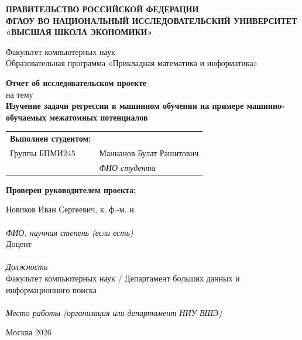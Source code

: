 \documentclass[12pt,a4paper]{article}
\begin{document}
\begin{titlepage}
\thispagestyle{empty}
\begin{center}
\textbf{ПРАВИТЕЛЬСТВО РОССИЙСКОЙ ФЕДЕРАЦИИ}\\
\textbf{ФГАОУ ВО НАЦИОНАЛЬНЫЙ ИССЛЕДОВАТЕЛЬСКИЙ УНИВЕРСИТЕТ}\\
\textbf{«ВЫСШАЯ ШКОЛА ЭКОНОМИКИ»}
\end{center}

\vspace{0.8cm}

\begin{center}
Факультет компьютерных наук\\
Образовательная программа «Прикладная математика и информатика»
\end{center}

\vfill

\begin{center}
\textbf{Отчет об исследовательском проекте}\\
на тему\\
\textbf{Изучение задачи регрессии в машинном обучении на примере машинно-обучаемых межатомных потенциалов}
\end{center}

\vfill

\noindent
\begin{tabularx}{\textwidth}{@{}lX@{}}
\textbf{Выполнен студентом:} & \\
Группы БПМИ245\,\underline{\hspace{2.0cm}} & Маннанов Булат Рашитович\\
 & \textit{ФИО студента}\\
\end{tabularx}

\vspace{0.8cm}

\noindent
\textbf{Проверен руководителем проекта:}\\
\begin{center}
Новиков Иван Сергеевич, к. ф.-м. н.\\[-0.2cm]
\makebox[\textwidth]{\hrulefill}\\
\textit{ФИО, научная степень (если есть)}\\[0.6cm]
Доцент\\[-0.2cm]
\makebox[\textwidth]{\hrulefill}\\
\textit{Должность}\\[0.6cm]
Факультет компьютерных наук / Департамент больших данных и информационного поиска\\[-0.2cm]
\makebox[\textwidth]{\hrulefill}\\
\textit{Место работы (организация или департамент НИУ ВШЭ)}
\end{center}

\vfill

\begin{center}
Москва 2026
\end{center}
\end{titlepage}
\end{document}
